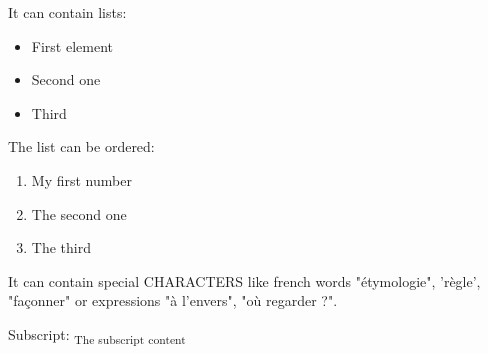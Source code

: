 \documentclass[letter,titlepage,oneside,11pt]{report}%
\begin{document}
\par%
\begin{FlushLeft}%
It can contain lists:%
\end{FlushLeft}%
\begin{itemize}%
\item First element%
\item Second one%
\item Third%
\end{itemize}%
\par%
\begin{FlushLeft}%
The list can be ordered:%
\end{FlushLeft}%
\begin{enumerate}%
\item My first number%
\item The second one%
\item The third%
\end{enumerate}%
\par%
\begin{FlushLeft}%
It can contain special CHARACTERS like french words "étymologie", 'règle', "façonner" or expressions "à l'envers", "où regarder ?".%
\end{FlushLeft}%
\par%
\begin{FlushLeft}%
Subscript: \textsubscript{The subscript content}%
\end{FlushLeft}%
\par%
\begin{FlushLeft}%
\end{FlushLeft}%
\par%
\begin{FlushLeft}%
\end{FlushLeft}%
\end{document}
